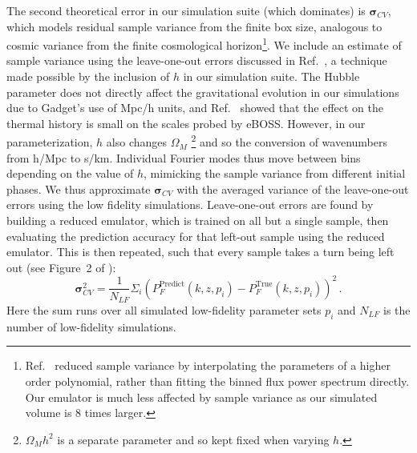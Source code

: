 The second theoretical error in our simulation suite (which dominates) is $\boldsymbol{\sigma}_{CV}$, which models residual sample variance from the finite box size, analogous to cosmic variance from the finite cosmological horizon\footnote{Ref.~\cite{2023ApJ...944..223P} reduced sample variance by interpolating the parameters of a higher order polynomial, rather than fitting the binned flux power spectrum directly.
Our emulator is much less affected by sample variance as our simulated volume is $8$ times larger.}.
We include an estimate of sample variance using the leave-one-out errors discussed in Ref.~\cite{2023simsuite}, a technique made possible by the inclusion of $h$ in our simulation suite.
The Hubble parameter does not directly affect the gravitational evolution in our simulations due to Gadget's use of Mpc/h units, and Ref.~\cite{2023simsuite} showed that the effect on the thermal history is small on the scales probed by eBOSS.
However, in our parameterization, $h$ also changes $\Omega_M$ \footnote{$\Omega_M h^2$ is a separate parameter and so kept fixed when varying $h$.}   and so the conversion of wavenumbers from h/Mpc to s/km.
Individual Fourier modes thus move between bins depending on the value of $h$, mimicking the sample variance from different initial phases.
We thus approximate $\boldsymbol{\sigma}_{CV}$ with the averaged variance of the leave-one-out errors using the low fidelity simulations.
Leave-one-out errors are found by building a reduced emulator, which is trained on all but a single sample, then evaluating the prediction accuracy for that left-out sample using the reduced emulator.
This is then repeated, such that every sample takes a turn being left out (see Figure~2 of \cite{2023simsuite}):
\begin{equation}
    \boldsymbol{\sigma}^2_{CV}  = \frac{1}{N_{LF}}\Sigma_i \left(P_F^\mathrm{Predict}(k, z, p_i) - P_F^\mathrm{True}(k, z, p_i)\right)^2\,.
\end{equation}
Here the sum runs over all simulated low-fidelity parameter sets $p_i$ and $N_{LF}$ is the number of low-fidelity simulations. 

